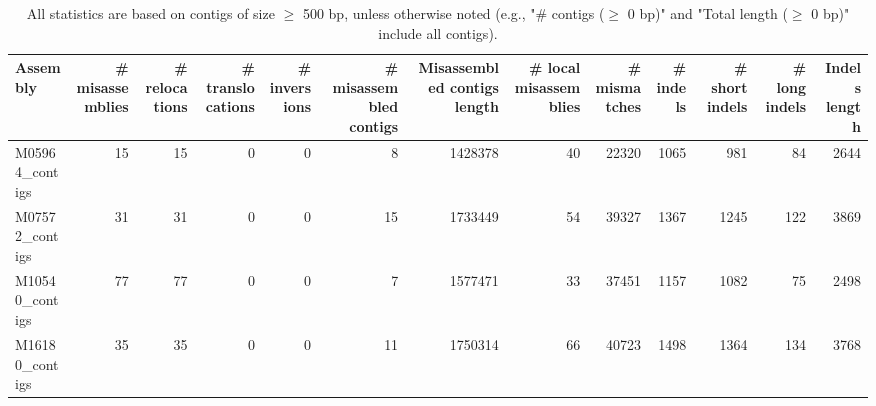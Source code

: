 \documentclass[12pt,a4paper]{article}
\begin{document}
\begin{table}[ht]
\begin{center}
\caption{All statistics are based on contigs of size $\geq$ 500 bp, unless otherwise noted (e.g., "\# contigs ($\geq$ 0 bp)" and "Total length ($\geq$ 0 bp)" include all contigs).}
\begin{tabular}{|l*{12}{|r}|}
\hline
Assembly & \# misassemblies &     \# relocations &     \# translocations &     \# inversions & \# misassembled contigs & Misassembled contigs length & \# local misassemblies & \# mismatches & \# indels &     \# short indels &     \# long indels & Indels length \\ \hline
M05964\_contigs & 15 & 15 & 0 & 0 & 8 & 1428378 & 40 & 22320 & 1065 & 981 & 84 & 2644 \\ \hline
M07572\_contigs & 31 & 31 & 0 & 0 & 15 & 1733449 & 54 & 39327 & 1367 & 1245 & 122 & 3869 \\ \hline
M10540\_contigs & 77 & 77 & 0 & 0 & 7 & 1577471 & 33 & 37451 & 1157 & 1082 & 75 & 2498 \\ \hline
M16180\_contigs & 35 & 35 & 0 & 0 & 11 & 1750314 & 66 & 40723 & 1498 & 1364 & 134 & 3768 \\ \hline
\end{tabular}
\end{center}
\end{table}
\end{document}
